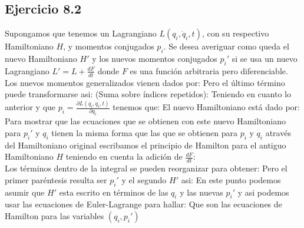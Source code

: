 

\subsection*{Ejercicio 8.2}
Supongamos que tenemos un Lagrangiano $L(q_i,\dot q_i,t)$, con su respectivo Hamiltoniano $H$, y momentos conjugados $p_i$. Se desea averiguar como queda el nuevo Hamiltoniano $H'$ y los nuevos momentos conjugados $p_i'$ si se usa un nuevo Lagrangiano $L'=L+\frac{dF}{dt}$ donde $F$ es una funci\'on arbitraria pero diferenciable.
Los nuevos momentos generalizados vienen dados por:
Pero el \'ultimo t\'ermino puede transformarse asi: (Suma sobre \'indices repetidos):
Teniendo en cuanto lo anterior y que $p_i=\frac{\partial L(q_i,\dot q_i,t)}{\partial \dot q_i}$ tenemos que:
El nuevo Hamiltoniano est\'a dado por: 
Para mostrar que las ecuaciones que se obtienen con este nuevo Hamiltoniano para $p_i'$ y $q_i$ tienen la misma forma que las que se obtienen para $p_i$ y $q_i$ atrav\'es del Hamiltoniano original escribamos el principio de Hamilton para el antiguo Hamiltoniano $H$ teniendo en cuenta la adici\'on de $\frac{dF}{dt}$:\\
Los t\'erminos dentro de la integral se pueden reorganizar para obtener:
Pero el primer par\'entesis resulta ser $p_i'$ y el segundo $H'$ asi:
En este punto podemos asumir que $H'$ esta escrito en t\'erminos de las $q_i$ y las nuevas $p_i'$ y asi podemos usar las ecuaciones de Euler-Lagrange para hallar:
Que son las ecuaciones de Hamilton para las variables $\left(q_i,p_i'\right)$\\
\\

